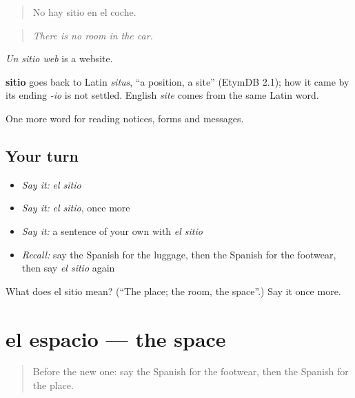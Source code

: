 \begin{quote}
No hay sitio en el coche.
\end{quote}

\begin{quote}
\emph{There is no room in the car.}
\end{quote}

\emph{Un sitio web} is a website.

\begin{cousinweb}
\textbf{sitio} goes back to Latin \emph{situs}, \textquotedblleft{}a position, a site\textquotedblright{} (EtymDB 2.1); how it came by its ending \emph{-io} is not settled. English \emph{site} comes from the same Latin word.
\end{cousinweb}

\begin{grammarlens}[title={What you've built}]
One more word for reading notices, forms and messages.
\end{grammarlens}

\subsection*{Your turn}
\begin{itemize}
\raggedright
  \item \emph{Say it:} \emph{el sitio}
  \item \emph{Say it:} \emph{el sitio}, once more
  \item \emph{Say it:} a sentence of your own with \emph{el sitio}
  \item \emph{Recall:} say the Spanish for the luggage, then the Spanish for the footwear, then say \emph{el sitio} again
\end{itemize}

\begin{tcolorbox}[breakable,colback=teal!4,colframe=teal!35!black,title={Before you move on}]
What does el sitio mean? (\textquotedblleft{}The place; the room, the space\textquotedblright{}.) Say it once more.
\end{tcolorbox}
\section[el espacio]{el espacio — the space}

\label{lesson:ES-C478-espacio}



\begin{quote}
Before the new one: say the Spanish for the footwear, then the Spanish for the place.
\end{quote}

